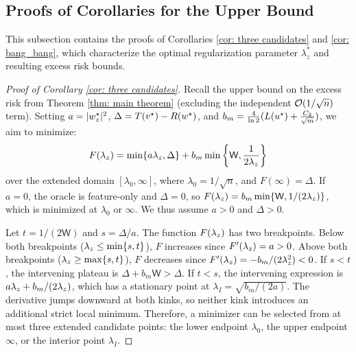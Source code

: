 \subsection{Proofs of Corollaries for the Upper Bound}\label{subsec:proofs_corollaries_upper_bound}

This subsection contains the proofs of Corollaries \ref{cor: three candidates} and \ref{cor: bang_bang}, which characterize the optimal regularization parameter $\lambda_z^*$ and resulting excess risk bounds.

\begin{proof}[Proof of Corollary \ref{cor: three candidates}]\label{proof:cor_three_candidates}
 Recall the upper bound on the excess risk from Theorem \ref{thm: main theorem} (excluding the independent $\mathcal{O}(1/\sqrt{n})$ term). Setting $a = |w^\star_z|^2$, $\Delta = T(v^\star) - R(w^\star)$, and $b_m = \frac{4}{\ln 2}(L(u^\star) + \frac{C_2}{\sqrt{m}})$, we aim to minimize:
 \begin{equation*}
     F(\lambda_z) = \min\{a\lambda_z, \Delta\} + b_m \min\left\{\mathsf{W}, \frac{1}{2\lambda_z}\right\}
 \end{equation*}
 over the extended domain $[\lambda_0, \infty]$, where $\lambda_0 = 1/\sqrt{n}$, and $F(\infty) = \Delta$.
 If $a=0$, the oracle is feature-only and $\Delta=0$, so $F(\lambda_z)=b_m\min\{\mathsf{W}, 1/(2\lambda_z)\}$, which is minimized at $\lambda_0$ or $\infty$. We thus assume $a>0$ and $\Delta>0$. 
 
 Let $t = 1/(2\mathsf{W})$ and $s = \Delta/a$. The function $F(\lambda_z)$ has two breakpoints. Below both breakpoints ($\lambda_z \le \min\{s, t\}$), $F$ increases since $F'(\lambda_z) = a > 0$. Above both breakpoints ($\lambda_z \ge \max\{s, t\}$), $F$ decreases since $F'(\lambda_z) = -b_m/(2\lambda_z^2) < 0$. If $s < t$, the intervening plateau is $\Delta + b_m \mathsf{W} > \Delta$. If $t < s$, the intervening expression is $a\lambda_z + b_m/(2\lambda_z)$, which has a stationary point at $\lambda_I = \sqrt{b_m/(2a)}$. The derivative jumps downward at both kinks, so neither kink introduces an additional strict local minimum. Therefore, a minimizer can be selected from at most three extended candidate points: the lower endpoint $\lambda_0$, the upper endpoint $\infty$, or the interior point $\lambda_I$.
 \end{proof}
 
